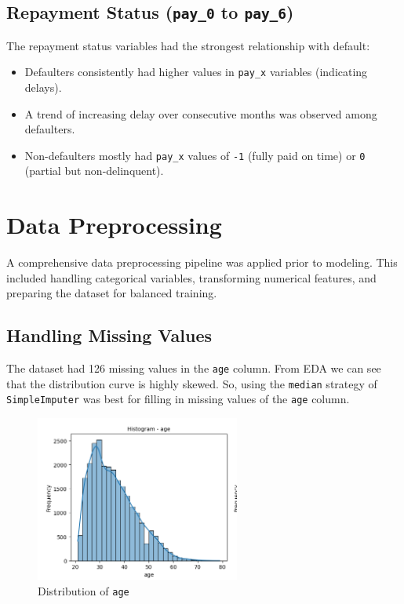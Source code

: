 \documentclass[12pt,a4paper]{article}
\begin{document}
\subsection{Repayment Status (\texttt{pay\_0} to \texttt{pay\_6})}
The repayment status variables had the strongest relationship with default:
\begin{itemize}
    \item Defaulters consistently had higher values in \texttt{pay\_x} variables (indicating delays).
    \item A trend of increasing delay over consecutive months was observed among defaulters.
    \item Non-defaulters mostly had \texttt{pay\_x} values of \texttt{-1} (fully paid on time) or \texttt{0} (partial but non-delinquent).
\end{itemize}




\section{Data Preprocessing}
A comprehensive data preprocessing pipeline was applied prior to modeling. This included handling categorical variables, transforming numerical features, and preparing the dataset for balanced training.

\subsection{Handling Missing Values}
The dataset had 126 missing values in the \texttt{age} column. From EDA we can see that the distribution curve is highly skewed. So, using the \texttt{median} strategy of \texttt{SimpleImputer} was best for filling in missing values of the \texttt{age} column.
\begin{figure}[H]
    \centering
    \includegraphics[width=0.6\textwidth]{figures/7.png}
    \caption{Distribution of \texttt{age}}
\end{figure}
\end{document}
